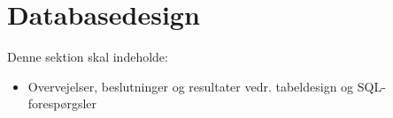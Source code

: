 \section{Databasedesign}
Denne sektion skal indeholde:

\begin{itemize}
    \item Overvejelser, beslutninger og resultater vedr. tabeldesign og SQL-forespørgsler 
\end{itemize}{}